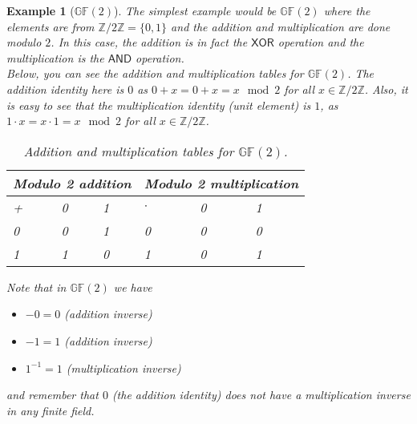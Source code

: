 \documentclass[12pt]{article}
\newtheorem{example}{Example}
\newcommand{\Zn}[1]{\mathds{Z}/#1\mathds{Z}}
\newcommand{\gf}[1]{\mathds{GF}\left(#1\right)} %
\begin{document}
\begin{example}[$\gf{2}$]
	The simplest example would be $\gf{2}$ where the elements are from $\Zn{2}= \{0,1\}$ and the addition and multiplication are done modulo $2$. In this case, the addition is in fact the $\mathsf{XOR}$ operation and the multiplication is the $\mathsf{AND}$ operation. \\
	
	Below, you can see the addition and multiplication tables for $\gf{2}$. The addition identity here is $0$ as $0+x = 0 + x = x \mod 2$ for all $x\in\Zn{2}$. Also, it is easy to see that the multiplication identity (unit element) is $1$, as $1 \cdot x = x \cdot 1 = x \mod 2$ for all $x\in\Zn{2}$. \\
	
	\begin{table}[h!]
		\centering
		\begin{tabular}{|m{3em}|m{3em}|m{3em}||m{3em}|m{3em}|m{3em}|}
			 
			\multicolumn{3}{c||}{Modulo 2 addition} &   \multicolumn{3}{c}{Modulo 2 multiplication}    \\  [0.5ex]
			\hline\hline 
			+ & 0 & 1 & $\cdot$ & 0 & 1 \\ 
			\hline 
			0 & 0 & 1 & 0 & 0 & 0 \\ 
			\hline 
			1 & 1 & 0 & 1 & 0 & 1 \\ 
			\hline 
		\end{tabular} 
		\caption{Addition and multiplication tables for $\gf{2}$.}
	\end{table}
	
	
	
	
	Note that in $\gf{2}$ we have
	\begin{itemize}
		\item  $-0 = 0$ \qquad (addition inverse)
		\item  $-1 = 1$ \qquad (addition inverse)
		\item $1^{-1} = 1$ \qquad (multiplication inverse)
	\end{itemize}
and remember that $0$ (the addition identity) does not have a multiplication inverse	in any finite field. 
	
	
	
\end{example}
\end{document}
